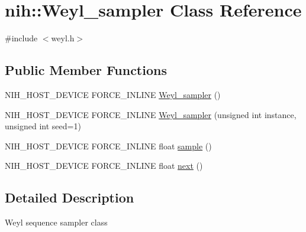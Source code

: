 \hypertarget{classnih_1_1_weyl__sampler}{
\section{nih\-:\-:\-Weyl\-\_\-sampler \-Class \-Reference}
\label{classnih_1_1_weyl__sampler}
}


{\ttfamily \#include $<$weyl.\-h$>$}

\subsection*{\-Public \-Member \-Functions}
\begin{DoxyCompactItemize}
\item 
\-N\-I\-H\-\_\-\-H\-O\-S\-T\-\_\-\-D\-E\-V\-I\-C\-E \-F\-O\-R\-C\-E\-\_\-\-I\-N\-L\-I\-N\-E \hyperlink{classnih_1_1_weyl__sampler_a6779f910941d3091addf98ed3604a2c9}{\-Weyl\-\_\-sampler} ()
\item 
\-N\-I\-H\-\_\-\-H\-O\-S\-T\-\_\-\-D\-E\-V\-I\-C\-E \-F\-O\-R\-C\-E\-\_\-\-I\-N\-L\-I\-N\-E \hyperlink{classnih_1_1_weyl__sampler_a1e5ffed23069b0d19a51b5f35e7d6d61}{\-Weyl\-\_\-sampler} (unsigned int instance, unsigned int seed=1)
\item 
\-N\-I\-H\-\_\-\-H\-O\-S\-T\-\_\-\-D\-E\-V\-I\-C\-E \-F\-O\-R\-C\-E\-\_\-\-I\-N\-L\-I\-N\-E float \hyperlink{classnih_1_1_weyl__sampler_abbaf6b7a83523e7416f49bc7a0b98079}{sample} ()
\item 
\-N\-I\-H\-\_\-\-H\-O\-S\-T\-\_\-\-D\-E\-V\-I\-C\-E \-F\-O\-R\-C\-E\-\_\-\-I\-N\-L\-I\-N\-E float \hyperlink{classnih_1_1_weyl__sampler_a5a26cbb3d753fac3a1cc504b44022dab}{next} ()
\end{DoxyCompactItemize}


\subsection{\-Detailed \-Description}
\-Weyl sequence sampler class 

